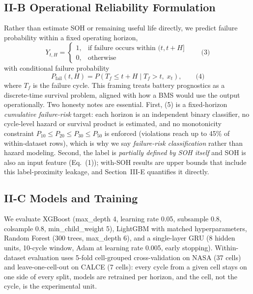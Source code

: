 \documentclass[conference]{IEEEtran}
\begin{document}
\subsection{II-B Operational Reliability Formulation}
Rather than estimate SOH or remaining useful life directly, we predict
failure probability within a fixed operating horizon,
\begin{equation}
Y_{t,H} =
\begin{cases}
1, & \text{if failure occurs within } (t, t+H]\\
0, & \text{otherwise}
\end{cases}
\qquad \text{(3)}
\end{equation}
with conditional failure probability
\begin{equation}
P_{\mathrm{fail}}(t, H) = P\!\left(T_f \le t + H \mid T_f > t,\; x_t\right),
\qquad \text{(4)}
\end{equation}
where $T_f$ is the failure cycle. This framing treats battery
prognostics as a discrete-time survival problem, aligned with how a BMS
would use the output operationally. Two honesty notes are essential.
First, (5) is a fixed-horizon \emph{cumulative failure-risk} target:
each horizon is an independent binary classifier, no cycle-level hazard
or survival product is estimated, and no monotonicity constraint
$P_{10}\le P_{20}\le P_{30}\le P_{50}$ is enforced (violations reach
up to 45\% of within-dataset rows), which is why we say
\emph{failure-risk classification} rather than hazard modeling.
Second, the label is \emph{partially defined by SOH itself} and SOH is
also an input feature (Eq.~(1)); with-SOH results are
upper bounds that include this label-proximity leakage, and
Section~III-E quantifies it directly.

\subsection{II-C Models and Training}
We evaluate XGBoost (max\_depth 4, learning rate 0.05, subsample 0.8,
colsample 0.8, min\_child\_weight 5), LightGBM with matched
hyperparameters, Random Forest (300 trees, max\_depth 6), and a
single-layer GRU (8 hidden units, 10-cycle window, Adam at learning
rate 0.005, early stopping). Within-dataset evaluation uses 5-fold
cell-grouped cross-validation on NASA (37 cells) and
leave-one-cell-out on CALCE (7 cells): every cycle from a given cell
stays on one side of every split, models are retrained per horizon,
and the cell, not the cycle, is the experimental unit.
\end{document}

